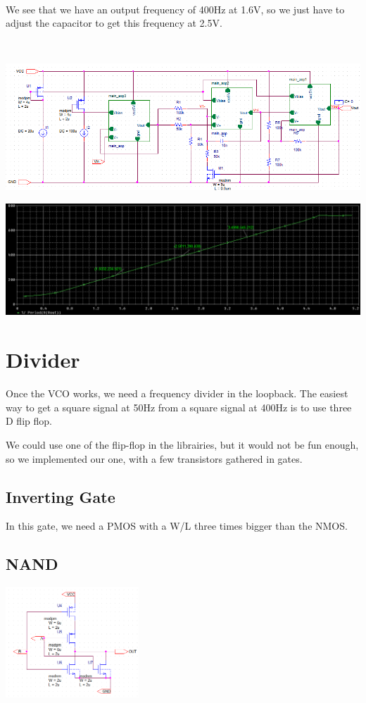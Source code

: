\documentclass{article}
\begin{document}
~

We see that we have an output frequency of 400Hz at 1.6V, so we just have to adjust the capacitor to get this frequency at 2.5V.

~

\includegraphics[width=15cm]{VCO_schema.png}

\includegraphics[width=15cm]{VCO_reponse.png}

\section{Divider}

Once the VCO works, we need a frequency divider in the loopback. The easiest way to get a square signal at 50Hz from a square signal at 400Hz is to use three D flip flop.

We could use one of the flip-flop in the librairies, but it would not be fun enough, so we implemented our one, with a few transistors gathered in gates.

\subsection{Inverting Gate}

In this gate, we need a PMOS with a W/L three times bigger than the NMOS.

\subsection{NAND}

\includegraphics[width=5cm]{nor.png}
\end{document}
